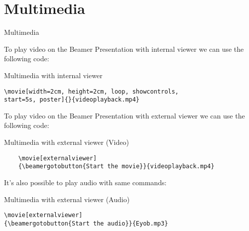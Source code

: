 \documentclass[10pt,xcolor=x11names]{beamer}
\begin{document}
\section{Multimedia}

\begin{frame}[fragile, shrink = 5]{Multimedia} \vspace{0pt}

To play video on the Beamer Presentation  with internal viewer we can use the following code:

\begin{exampleblock}{Multimedia with internal viewer}
\begin{verbatim}
\movie[width=2cm, height=2cm, loop, showcontrols,
start=5s, poster]{}{videoplayback.mp4}
\end{verbatim}	
\end{exampleblock}


To play video on the Beamer Presentation with external viewer we can use the following code:

\begin{exampleblock}{Multimedia with external viewer (Video)}
	\begin{verbatim}
	\movie[externalviewer]
	{\beamergotobutton{Start the movie}}{videoplayback.mp4}
	\end{verbatim}	
\end{exampleblock}


It's also possible to play audio with same commands:

\begin{exampleblock}{Multimedia with external viewer (Audio)}
	\begin{verbatim}
\movie[externalviewer]
{\beamergotobutton{Start the audio}}{Eyob.mp3}
	\end{verbatim}	
\end{exampleblock}

\end{frame}
\end{document}
